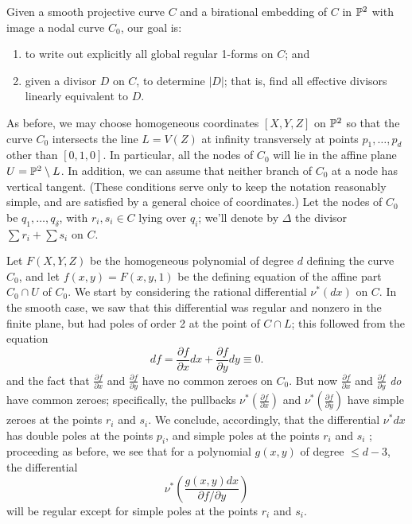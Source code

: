 Given a smooth projective curve $C$ and a birational embedding of $C$ in ${\mathbb P}^2$ with image a nodal curve $C_0$, our goal is:
\begin{enumerate}
\item to write out explicitly all global regular 1-forms on $C$; and
\item given a divisor $D$ on $C$, to  determine $|D|$; that is, find all effective divisors linearly equivalent to $D$.
\end{enumerate}

As before, we may choose homogeneous coordinates  $[X,Y,Z]$ on ${\mathbb P}^2$ so that the curve $C_0$ intersects the line $L = V(Z)$ at infinity transversely at points $p_1,\dots,p_d$ other than $[0,1,0]$. In particular,  all the nodes of $C_0$ will lie in the affine plane $U = {\mathbb P}^2 \setminus L$.
In addition, we can assume that  neither branch of $C_0$ at a node has vertical tangent. (These conditions serve only to keep the notation reasonably simple, and are satisfied by a general choice of coordinates.) Let the nodes of $C_0$ be $q_1,\dots,q_\delta$, with $r_i, s_i \in C$ lying over $q_i$; we'll denote by $\Delta$ the divisor $\sum r_i + \sum s_i$ on $C$.

Let $F(X,Y,Z)$ be the homogeneous polynomial of degree $d$ defining the curve $C_0$, and let $f(x,y) = F(x,y,1)$ be the defining equation of the affine part $C_0 \cap U$ of $C_0$. We start by considering the rational differential $\nu^*(dx)$ on $C$. In the smooth case, we saw that this differential was regular and nonzero in the finite plane, but had poles of order 2 at the point of $C \cap L$; this followed from the equation
$$
 df = \frac{\partial f}{\partial x}dx + \frac{\partial f}{\partial y}dy \equiv 0.
 $$
and the fact that $\frac{\partial f}{\partial x}$ and $\frac{\partial f}{\partial y}$ have no common zeroes on $C_0$. But now $\frac{\partial f}{\partial x}$ and $\frac{\partial f}{\partial y}$ \emph{do} have common zeroes; specifically, the pullbacks $\nu^*(\frac{\partial f}{\partial x})$ and $\nu^*(\frac{\partial f}{\partial y})$ have simple zeroes at the points $r_i$ and $s_i$. We conclude, accordingly, that the differential $\nu^*dx$ has double poles at the points $p_i$, and simple poles at the points $r_i$ and $s_i$ ; proceeding as before, we see that for a polynomial $g(x,y)$ of degree $\leq d-3$, the differential
$$
\nu^*( \frac{g(x,y)dx}{\partial f/\partial y})
$$
will be regular except for simple poles at the points $r_i$ and $s_i$.

